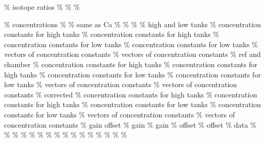 \documentclass[]{article}
\begin{document}
\% isotope ratios \newcommand{\sxi}{\xi_{}} \%
\newcommand{\sdeltao}{\delta_{\textrm{o}}} \%
\newcommand{\sdeltae}{\delta_{\textrm{e}}} \%

\% concentrations \newcommand{\sCa}{C_{\textrm{a}}} \%
\newcommand{\sCo}{C_{\textrm{o}}} \% same as Ca
\newcommand{\sCs}{C_{\textrm{s}}} \% \newcommand{\sCi}{C_{\textrm{i}}}
\% \newcommand{\sCe}{C_{\textrm{e}}} \% \% high and low tanks
\newcommand{\skappaHtw}{\kappa_{\textrm{H}12}} \% concentration
constants for high tanks \newcommand{\skappaHth}{\kappa_{\textrm{H}13}}
\% concentration constants for high tanks
\newcommand{\skappaLtw}{\kappa_{\textrm{L}12}} \% concentration
constants for low tanks \newcommand{\skappaLth}{\kappa_{\textrm{L}13}}
\% concentration constants for low tanks
\newcommand{\vkappaH}{{\kappa}_{\textrm{H}}} \% vectors of concentration
constants \newcommand{\vkappaL}{{\kappa}_{\textrm{L}}} \% vectors of
concentration constants \% ref and chamber
\newcommand{\skappaRtw}{\kappa_{\textrm{R}12}} \% concentration
constants for high tanks \newcommand{\skappaRth}{\kappa_{\textrm{R}13}}
\% concentration constants for high tanks
\newcommand{\skappaCtw}{\kappa_{\textrm{C}12}} \% concentration
constants for low tanks \newcommand{\skappaCth}{\kappa_{\textrm{C}13}}
\% concentration constants for low tanks
\newcommand{\vkappaR}{{\kappa}_{\textrm{R}}} \% vectors of concentration
constants \newcommand{\vkappaC}{{\kappa}_{\textrm{C}}} \% vectors of
concentration constants \% corrected
\newcommand{\skappaRtwp}{\kappa_{\textrm{R}12}^{\prime}} \%
concentration constants for high tanks
\newcommand{\skappaRthp}{\kappa_{\textrm{R}13}^{\prime}} \%
concentration constants for high tanks
\newcommand{\skappaCtwp}{\kappa_{\textrm{C}12}^{\prime}} \%
concentration constants for low tanks
\newcommand{\skappaCthp}{\kappa_{\textrm{C}13}^{\prime}} \%
concentration constants for low tanks
\newcommand{\vkappaRp}{{\kappa}_{\textrm{R}}^{\prime}} \% vectors of
concentration constants
\newcommand{\vkappaCp}{{\kappa}_{\textrm{C}}^{\prime}} \% vectors of
concentration constants \% gain offset
\newcommand{\sgtw}{g_{\textrm{12}}} \% gain
\newcommand{\sgth}{g_{\textrm{13}}} \% gain
\newcommand{\sotw}{o_{\textrm{12}}} \% offset
\newcommand{\soth}{o_{\textrm{13}}} \% offset \% data
\newcommand{\vdatakappaH}{\tilde{{\kappa}}_{\textrm{H}}} \%
\newcommand{\vdatakappaL}{\tilde{{\kappa}}_{\textrm{L}}} \%
\newcommand{\vdatakappaR}{\tilde{{\kappa}}_{\textrm{R}}} \%
\newcommand{\vdatakappaC}{\tilde{{\kappa}}_{\textrm{C}}} \%
\newcommand{\sdatakappaHtw}{\tilde{\kappa}_{\textrm{H}12}} \%
\newcommand{\sdatakappaHth}{\tilde{\kappa}_{\textrm{H}13}} \%
\newcommand{\sdatakappaLtw}{\tilde{\kappa}_{\textrm{L}12}} \%
\newcommand{\sdatakappaLth}{\tilde{\kappa}_{\textrm{L}13}} \%
\newcommand{\sdatakappaRtw}{\tilde{\kappa}_{\textrm{R}12}} \%
\newcommand{\sdatakappaRth}{\tilde{\kappa}_{\textrm{R}13}} \%
\newcommand{\sdatakappaCtw}{\tilde{\kappa}_{\textrm{C}12}} \%
\newcommand{\sdatakappaCth}{\tilde{\kappa}_{\textrm{C}13}} \%
\newcommand{\vsigkappaH}{\Sigma_{{\kappa}_{\textrm{H}}}} \%
\newcommand{\vsigkappaL}{\Sigma_{{\kappa}_{\textrm{L}}}} \%
\newcommand{\vsigkappaR}{\Sigma_{{\kappa}_{\textrm{R}}}} \%
\newcommand{\vsigkappaC}{\Sigma_{{\kappa}_{\textrm{C}}}} \%
\end{document}
